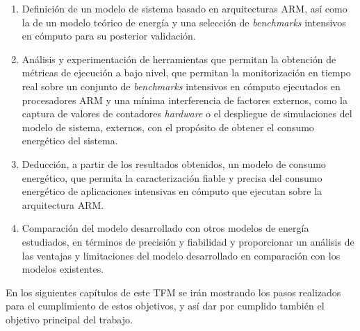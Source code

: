 \begin{enumerate}
    \item Definición de un modelo de sistema basado en arquitecturas \ac{ARM}, así como la de un modelo teórico de energía y una selección de \textit{benchmarks} intensivos en cómputo para su posterior validación. 

    \item Análisis y experimentación de herramientas que permitan la obtención de métricas de ejecución a bajo nivel, que permitan la monitorización en tiempo real sobre un conjunto de \textit{benchmarks} intensivos en cómputo ejecutados en procesadores \ac{ARM} y una mínima interferencia de factores externos, como la captura de valores de contadores \textit{hardware} o el despliegue de simulaciones del modelo de sistema, externos, con el propósito de obtener el consumo energético del sistema.
    

    \item Deducción, a partir de los resultados obtenidos, un modelo de consumo energético, que permita la caracterización fiable y precisa del consumo energético de aplicaciones intensivas en cómputo que ejecutan sobre la arquitectura \ac{ARM}.

    \item Comparación del modelo desarrollado con otros modelos de energía estudiados, en términos de precisión y fiabilidad y proporcionar un análisis de las ventajas y limitaciones del modelo desarrollado en comparación con los modelos existentes. \\
\end{enumerate}

En los siguientes capítulos de este \ac{TFM} se irán mostrando los pasos realizados para el cumplimiento de estos objetivos, y así dar por cumplido también el objetivo principal del trabajo.
